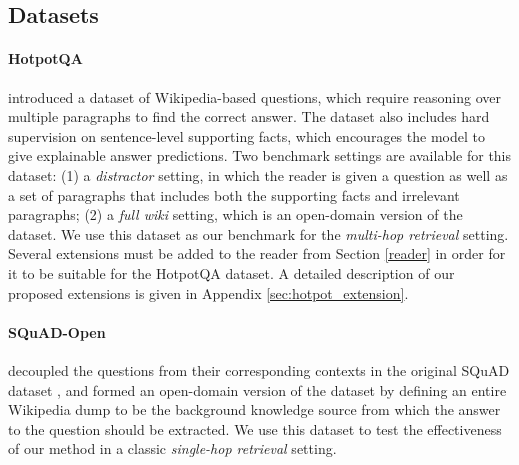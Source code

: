 \documentclass[11pt,a4paper,dvipsnames]{article}
\begin{document}
\subsection{Datasets}
\paragraph{HotpotQA} \citet{Yang0ZBCSM18hotpot} introduced a dataset of Wikipedia-based questions, which require reasoning over multiple paragraphs to find the correct answer. The dataset also includes hard supervision on sentence-level supporting facts, which encourages the model to give explainable answer predictions. Two benchmark settings are available for this dataset: (1) a \emph{distractor} setting, in which the reader is given a question as well as a set of paragraphs that includes both the supporting facts and irrelevant paragraphs; (2) a \emph{full wiki} setting, which is an open-domain version of the dataset. We use this dataset as our benchmark for the \textit{multi-hop retrieval} setting. Several extensions must be added to the reader from Section \ref{reader} in order for it to be suitable for the HotpotQA dataset. A detailed description of our proposed extensions is given in Appendix \ref{sec:hotpot_extension}.



\paragraph{SQuAD-Open} \citet{ChenFWB17drqa} decoupled the questions from their corresponding contexts in the original SQuAD dataset \citep{RajpurkarZLL16squad}, and formed an open-domain version of the dataset by defining an entire Wikipedia dump to be the background knowledge source from which the answer to the question should be extracted. We use this dataset to test the effectiveness of our method in a classic \textit{single-hop retrieval} setting.
\end{document}
